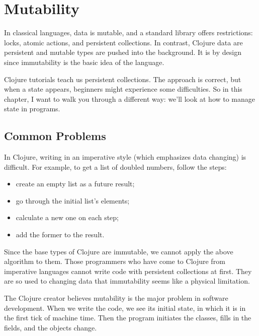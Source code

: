 \chapter{Mutability}


\begin{teaser}
In classical languages, data is mutable, and a standard library offers restrictions: locks, atomic actions, and persistent collections. In contrast, Clojure data are persistent and mutable types are pushed into the background. It is by design since immutability is the basic idea of the language.
\end{teaser}

Clojure tutorials teach us persistent collections.
The approach is correct, but when a state appears, beginners might experience some difficulties.
So in this chapter, I want to walk you through a different way: we'll look at how to manage state in programs.

\section{Common Problems}

In Clojure, writing in an imperative style (which emphasizes data changing) is difficult. For example, to get a list of doubled numbers, follow the steps:


\begin{itemize}
\item
  create an empty list as a future result;
\item
  go through the initial list's elements;
\item
  calculate a new one on each step;
\item
  add the former to the result.
\end{itemize}

Since the base types of Clojure are immutable, we cannot apply the above algorithm to them. Those programmers who have come to Clojure from imperative languages cannot write code with persistent collections at first. They are so used to changing data that immutability seems like a physical limitation.

The Clojure creator believes mutability is the major problem in software development.
When we write the code, we see its initial state, in which it is in the first tick of machine time.
Then the program initiates the classes, fills in the fields, and the objects change.

